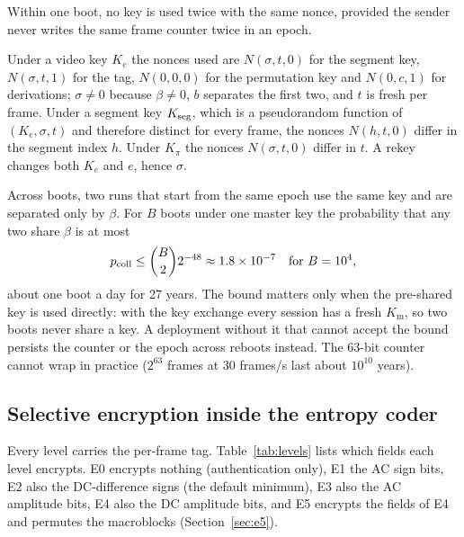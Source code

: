 \begin{proposition}\label{prop:nonce}
Within one boot, no key is used twice with the same nonce, provided the sender never writes the same frame counter twice in an epoch.
\end{proposition}
\begin{IEEEproof}
Under a video key $K_e$ the nonces used are $N(\sigma, t, 0)$ for the segment key, $N(\sigma, t, 1)$ for the tag, $N(0, 0, 0)$ for the permutation key and $N(0, c, 1)$ for derivations; $\sigma \ne 0$ because $\beta \ne 0$, $b$ separates the first two, and $t$ is fresh per frame. Under a segment key $K_{\mathrm{seg}}$, which is a pseudorandom function of $(K_e, \sigma, t)$ and therefore distinct for every frame, the nonces $N(h, t, 0)$ differ in the segment index $h$. Under $K_\pi$ the nonces $N(\sigma, t, 0)$ differ in $t$. A rekey changes both $K_e$ and $e$, hence $\sigma$.
\end{IEEEproof}
Across boots, two runs that start from the same epoch use the same key and are separated only by $\beta$. For $B$ boots under one master key the probability that any two share $\beta$ is at most
\begin{equation}
p_{\mathrm{coll}} \le \binom{B}{2} 2^{-48} \approx 1.8\times 10^{-7} \quad \text{for } B = 10^4,
\label{eq:boot}
\end{equation}
about one boot a day for 27 years. The bound matters only when the pre-shared key is used directly: with the key exchange every session has a fresh $K_{\mathrm{m}}$, so two boots never share a key. A deployment without it that cannot accept the bound persists the counter or the epoch across reboots instead. The 63-bit counter cannot wrap in practice ($2^{63}$ frames at 30 frames/s last about $10^{10}$ years).

\subsection{Selective encryption inside the entropy coder}\label{sec:selenc}
Every level carries the per-frame tag. Table~\ref{tab:levels} lists which fields each level encrypts. E0 encrypts nothing (authentication only), E1 the AC sign bits, E2 also the DC-difference signs (the default minimum), E3 also the AC amplitude bits, E4 also the DC amplitude bits, and E5 encrypts the fields of E4 and permutes the macroblocks (Section~\ref{sec:e5}).


